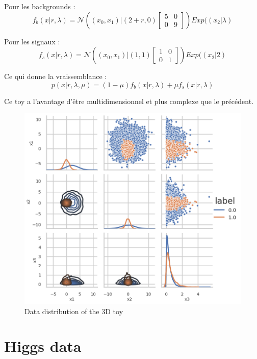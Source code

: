 Pour les backgrounds :
$$
f_b (x|r, \lambda) = \mathcal N \left ( (x_0, x_1) | (2+r, 0) 
\begin{bmatrix} 5 & 0 \\ 0 & 9 \end{bmatrix} \right ) Exp((x_2| \lambda)
$$


Pour les signaux :
$$
f_s (x|r, \lambda) = \mathcal N \left ( (x_0, x_1) | (1, 1) 
\begin{bmatrix} 1 & 0 \\ 0 & 1 \end{bmatrix} \right ) Exp((x_2| 2)
$$

Ce qui donne la vraissemblance :
$$
p(x | r, \lambda, \mu ) = (1-\mu) f_b(x|r, \lambda) + \mu f_s(x|r, \lambda)
$$

Ce toy a l'avantage d'être multidimensionnel et plus complexe que le précédent.


\begin{figure}[htb]
    \includegraphics[width=\linewidth]{s3d2/pairgrid}
    \caption{Data distribution of the 3D toy}
    \label{fig:s3d2_pairgrid}
\end{figure}






\section{Higgs data} %
\label{sec:higgs_data}



